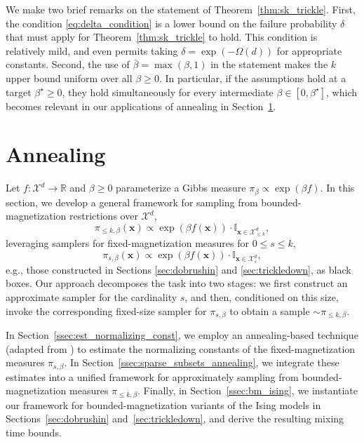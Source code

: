 \documentclass[11pt]{article}
\newcommand{\R}{\mathbb{R}}
\newcommand{\1}{\mathbf{1}}
\newcommand{\0}{\mathbf{0}}
\newcommand{\ind}{\mathbb{I}}
\newcommand{\Par}[1]{\left(#1\right)}
\newcommand{\vx}{{\mathbf{x}}}
\newcommand{\calX}{{\mathcal{X}}}
\begin{document}
We make two brief remarks on the statement of Theorem~\ref{thm:sk_trickle}. First, the condition \eqref{eq:delta_condition} is a lower bound on the failure probability $\delta$ that must apply for Theorem~\ref{thm:sk_trickle} to hold. This condition is relatively mild, and even permits taking $\delta = \exp(-\Omega(d))$ for appropriate constants. Second, the use of $\bar{\beta} = \max(\beta, 1)$ in the statement makes the $k$ upper bound uniform over all $\beta \ge 0$. In particular, if the assumptions hold at a target $\beta^\star \ge 0$, they hold simultaneously for every intermediate $\beta \in [0, \beta^\star]$, which becomes relevant in our applications of annealing in Section~\ref{sec:bm_sampling_anneal}.
\section{Annealing}\label{sec:bm_sampling_anneal}
Let $f: \calX^d \to \R$ and $\beta \ge 0$ parameterize a Gibbs measure $\pi_\beta \propto \exp(\beta f)$. In this section, we develop a general framework for sampling from bounded-magnetization restrictions over $\calX^d$, 
\begin{equation}\label{eq:gibbs_sparse}
\pi_{\le k, \beta}(\vx) \propto \exp\Par{\beta f(\vx)} \cdot \ind_{\vx \in \calX^d_{\le k}},
\end{equation}
leveraging samplers for fixed-magnetization measures for $0 \le s \le k$,
\begin{equation}\label{eq:gibbs_fixed}\pi_{s, \beta}(\vx) \propto \exp\Par{\beta f(\vx)} \cdot \ind_{\vx \in \calX^d_{s}},\end{equation}
e.g., those constructed in Sections \ref{sec:dobrushin} and \ref{sec:trickledown}, as black boxes. Our approach decomposes the task into two stages: we first construct an approximate sampler for the cardinality $s$, and then, conditioned on this size, invoke the corresponding fixed-size sampler for $\pi_{s, \beta}$ to obtain a sample $\sim \pi_{\le k, \beta}$.

In Section~\ref{ssec:est_normalizing_const}, we employ an annealing-based technique (adapted from \cite{Kolmogorov18}) to estimate the normalizing constants of the fixed-magnetization measures $\pi_{s, \beta}$. In Section~\ref{ssec:sparse_subsets_annealing}, we integrate these estimates into a unified framework for approximately sampling from bounded-magnetization measures $\pi_{\le k, \beta}$. Finally, in Section~\ref{ssec:bm_ising}, we instantiate our framework for bounded-magnetization variants of the Ising models in Sections~\ref{sec:dobrushin} and~\ref{sec:trickledown}, and derive the resulting mixing time bounds.
\end{document}
